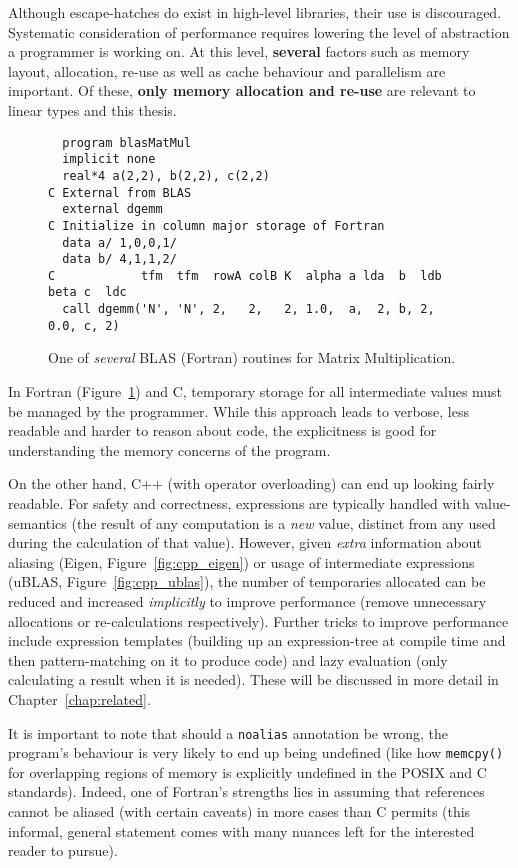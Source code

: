 Although escape-hatches do exist in high-level libraries, their use is
discouraged. Systematic consideration of performance requires lowering the
level of abstraction a programmer is working on. At this level, \textbf{several}
factors such as memory layout, allocation, re-use as well as cache behaviour
and parallelism are important. Of these, \textbf{only memory allocation and
re-use} are relevant to linear types and this thesis.

\begin{figure}[tp]
    \centering
    \begin{verbatim}
  program blasMatMul
  implicit none
  real*4 a(2,2), b(2,2), c(2,2)
C External from BLAS
  external dgemm
C Initialize in column major storage of Fortran
  data a/ 1,0,0,1/
  data b/ 4,1,1,2/
C            tfm  tfm  rowA colB K  alpha a lda  b  ldb beta c  ldc
  call dgemm('N', 'N', 2,   2,   2, 1.0,  a,  2, b, 2,  0.0, c, 2)
    \end{verbatim}
    \caption{One of \emph{several} BLAS (Fortran) routines for Matrix
    Multiplication.}\label{fig:fortran_blas}
\end{figure}

In Fortran (Figure~\ref{fig:fortran_blas}) and C, temporary storage for all
intermediate values must be managed by the programmer. While this approach
leads to verbose, less readable and harder to reason about code, the
explicitness is good for understanding the memory concerns of the program.

On the other hand, C++ (with operator overloading) can end up looking fairly
readable. For safety and correctness, expressions are typically handled with
value-semantics (the result of any computation is a \emph{new} value, distinct
from any used during the calculation of that value). However, given
\emph{extra} information about aliasing (Eigen, Figure~\ref{fig:cpp_eigen}) or
usage of intermediate expressions (uBLAS, Figure~\ref{fig:cpp_ublas}), the
number of temporaries allocated can be reduced and increased \emph{implicitly}
to improve performance (remove unnecessary allocations or re-calculations
respectively). Further tricks to improve performance include expression
templates (building up an expression-tree at compile time and then
pattern-matching on it to produce code) and lazy evaluation (only calculating a
result when it is needed). These will be discussed in more detail in
Chapter~\ref{chap:related}.

It is important to note that should a \texttt{noalias} annotation be wrong, the
program's behaviour is very likely to end up being undefined (like how
\texttt{memcpy()} for overlapping regions of memory is explicitly undefined in
the POSIX and C standards). Indeed, one of Fortran's strengths lies in assuming
that references cannot be aliased (with certain caveats) in more cases than C
permits (this informal, general statement comes with many nuances left for the
interested reader to pursue).

